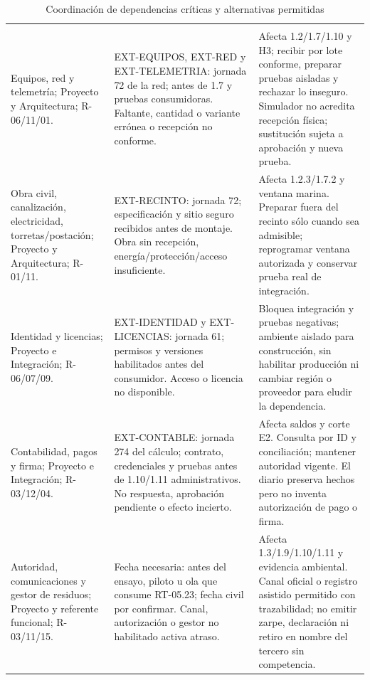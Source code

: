 \begingroup\setlength{\tabcolsep}{3pt}
\begin{longtable}{L{\dimexpr.24\tabcolsep\relax}L{\dimexpr.34\tabcolsep\relax}L{\dimexpr.42\tabcolsep\relax}}
\caption{Coordinación de dependencias críticas y alternativas permitidas}\label{tab:sd8-dependencias-p05}\\\hline
{} &  & \\\hline\endfirsthead
\hline{} &  & \\\hline\endhead
Equipos, red y telemetría; Proyecto y Arquitectura; R-06/11/01. & EXT-EQUIPOS, EXT-RED y EXT-TELEMETRIA: jornada 72 de la red; antes de 1.7 y pruebas consumidoras. Faltante, cantidad o variante errónea o recepción no conforme. & Afecta 1.2/1.7/1.10 y H3; recibir por lote conforme, preparar pruebas aisladas y rechazar lo inseguro. Simulador no acredita recepción física; sustitución sujeta a aprobación y nueva prueba.\\\hline
Obra civil, canalización, electricidad, torretas/postación; Proyecto y Arquitectura; R-01/11. & EXT-RECINTO: jornada 72; especificación y sitio seguro recibidos antes de montaje. Obra sin recepción, energía/protección/acceso insuficiente. & Afecta 1.2.3/1.7.2 y ventana marina. Preparar fuera del recinto sólo cuando sea admisible; reprogramar ventana autorizada y conservar prueba real de integración.\\\hline
Identidad y licencias; Proyecto e Integración; R-06/07/09. & EXT-IDENTIDAD y EXT-LICENCIAS: jornada 61; permisos y versiones habilitados antes del consumidor. Acceso o licencia no disponible. & Bloquea integración y pruebas negativas; ambiente aislado para construcción, sin habilitar producción ni cambiar región o proveedor para eludir la dependencia.\\\hline
Contabilidad, pagos y firma; Proyecto e Integración; R-03/12/04. & EXT-CONTABLE: jornada 274 del cálculo; contrato, credenciales y pruebas antes de 1.10/1.11 administrativos. No respuesta, aprobación pendiente o efecto incierto. & Afecta saldos y corte E2. Consulta por ID y conciliación; mantener autoridad vigente. El diario preserva hechos pero no inventa autorización de pago o firma.\\\hline
Autoridad, comunicaciones y gestor de residuos; Proyecto y referente funcional; R-03/11/15. & Fecha necesaria: antes del ensayo, piloto u ola que consume RT-05.23; fecha civil por confirmar. Canal, autorización o gestor no habilitado activa atraso. & Afecta 1.3/1.9/1.10/1.11 y evidencia ambiental. Canal oficial o registro asistido permitido con trazabilidad; no emitir zarpe, declaración ni retiro en nombre del tercero sin competencia.\\\hline

\end{longtable}
